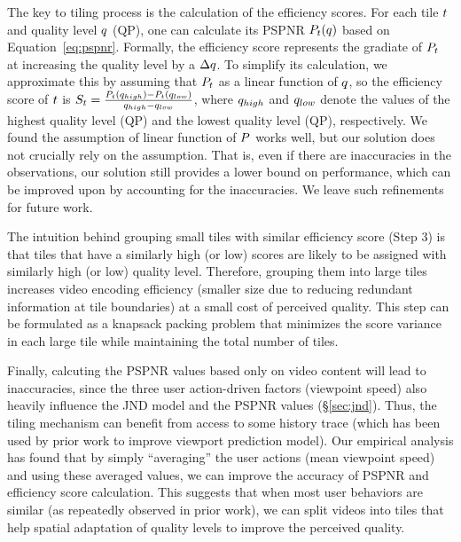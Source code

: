 The key to \name tiling process is the calculation of the efficiency scores. 
For each tile $t$ and quality level $q$ (\eg QP), one can calculate its PSPNR $P_t(q)$ based on Equation~\ref{eq:pspnr}.
Formally, the efficiency score represents the gradiate of $P_t$ at increasing the quality level by a $\Delta q$.
To simplify its calculation, we approximate this by assuming that $P_t$ as a linear function of $q$, so the efficiency score of $t$ is $S_t=\frac{P_t(q_{high})-P_t(q_{low})}{q_{high}-q_{low}}$, where $q_{high}$ and $q_{low}$ denote the values of the highest quality level (QP) and the lowest quality level (QP), respectively.
We found the assumption of linear function of $P$ works well, but our solution does not crucially rely on the assumption. 
That is, even if there are inaccuracies in the observations, our solution still provides a lower bound on performance, which can be improved upon by accounting for the inaccuracies. We leave such refinements for future work.

The intuition behind grouping small tiles with similar efficiency score (Step 3) is that tiles that have a similarly high (or low) scores are likely to be assigned with similarly high (or low) quality level. 
Therefore, grouping them into large tiles increases video encoding efficiency (\ie smaller size due to reducing redundant information at tile boundaries) at a small cost of perceived quality.
This step can be formulated as a knapsack packing problem that minimizes the score variance in each large tile while maintaining the total number of tiles.


Finally, calcuting the PSPNR values based only on video content will lead to inaccuracies, since the three user action-driven factors (\eg viewpoint speed) also heavily influence the JND model and the PSPNR values (\S\ref{sec:jnd}).
Thus, the \name tiling mechanism can benefit from access to some history trace (which has been used by prior work to improve viewport prediction model).
Our empirical analysis has found that by simply ``averaging'' the user actions (\eg mean viewpoint speed) and using these averaged values, we can improve the accuracy of PSPNR and efficiency score calculation. 
This suggests that when most \vrvideo user behaviors are similar (as repeatedly observed in prior work), we can split videos into tiles that help spatial adaptation of quality levels to improve the perceived quality.




